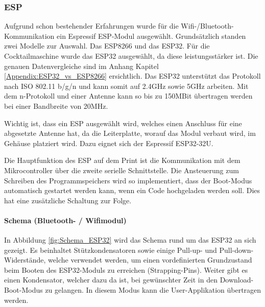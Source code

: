 \newpage
\subsubsection{ESP}
\label{subsubsec:ESP}

Aufgrund schon bestehender Erfahrungen wurde für die Wifi-/Bluetooth-Kommunikation ein Espressif ESP-Modul ausgewählt. Grundsätzlich standen zwei Modelle zur Auswahl. Das ESP8266 und das ESP32. Für die Cocktailmaschine wurde das ESP32 ausgewählt, da diese leistungsstärker ist. Die genauen Datenvergleiche sind im Anhang Kapitel \ref{Appendix:ESP32_vs_ESP8266} ersichtlich. Das ESP32 unterstützt das Protokoll nach ISO 802.11 b/g/n und kann somit auf 2.4GHz sowie 5GHz arbeiten. Mit dem n-Protokoll und einer Antenne kann so bis zu 150MBit übertragen werden bei einer Bandbreite von 20MHz.

Wichtig ist, dass ein ESP ausgewählt wird, welches einen Anschluss für eine abgesetzte Antenne hat, da die Leiterplatte, worauf das Modul verbaut wird, im Gehäuse platziert wird. Dazu eignet sich der Espressif ESP32-32U.

Die Hauptfunktion des ESP auf dem Print ist die Kommunikation mit dem Mikrocontroller über die zweite serielle Schnittstelle. Die Ansteuerung zum Schreiben des Programmspeichers wird so implementiert, dass der Boot-Modus automatisch gestartet werden kann, wenn ein Code hochgeladen werden soll. Dies hat eine zusätzliche Schaltung zur Folge.

%

\paragraph{Schema (Bluetooth- / Wifimodul)}\mbox{}

In Abbildung \ref{fig:Schema_ESP32} wird das Schema rund um das ESP32 an sich gezeigt. Es beinhaltet Stützkondensatoren sowie einige Pull-up- und Pull-down-Widerstände, welche verwendet werden, um einen vordefinierten Grundzustand beim Booten des ESP32-Moduls zu erreichen (Strapping-Pins). Weiter gibt es einen Kondensator, welcher dazu da ist, bei gewünschter Zeit in den Download-Boot-Modus zu gelangen. In diesem Modus kann die User-Applikation übertragen werden.

